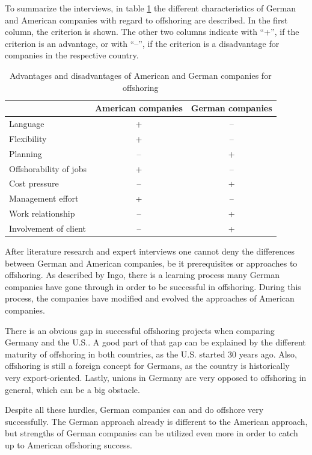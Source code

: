 To summarize the interviews, in table \ref{tab:Comparison} the different characteristics of German and American companies with regard to offshoring are described. In the first column, the criterion is shown. The other two columns indicate with ``+'', if the criterion is an advantage, or with ``--'', if the criterion is a disadvantage for companies in the respective country.
\vspace{3mm}
\begin{table}[htb]
	\centering
	\begin{tabular}{l|c|c}
		& \textbf{American companies} & \textbf{German companies}\\\hline
		\rule{0pt}{3ex}Language&+&--\\ \hline
		\rule{0pt}{3ex}Flexibility&+&--\\ \hline
		\rule{0pt}{3ex}Planning&--&+\\ \hline
		\rule{0pt}{3ex}Offshorability of jobs &+&--\\ \hline
		\rule{0pt}{3ex}Cost pressure&--&+\\ \hline
		\rule{0pt}{3ex}Management effort&+&--\\ \hline
		\rule{0pt}{3ex}Work relationship&--&+\\ \hline
		\rule{0pt}{3ex}Involvement of client&--&+\\ \hline
	\end{tabular}
	\vspace{3mm}
	\caption{Advantages and disadvantages of American and German companies for offshoring}
	\label{tab:Comparison}
\end{table}

After literature research and expert interviews one cannot deny the differences between German and American companies, be it prerequisites or approaches to offshoring. As described by Ingo, there is a learning process many German companies have gone through in order to be successful in offshoring. During this process, the companies have modified and evolved the approaches of American companies.

There is an obvious gap in successful offshoring projects when comparing Germany and the U.S.. A good part of that gap can be explained by the different maturity of offshoring in both countries, as the U.S. started 30 years ago. Also, offshoring is still a foreign concept for Germans, as the country is historically very export-oriented. Lastly, unions in Germany are very opposed to offshoring in general, which can be a big obstacle.

Despite all these hurdles, German companies can and do offshore very successfully. The German approach already is different to the American approach, but strengths of German companies can be utilized even more in order to catch up to American offshoring success.


